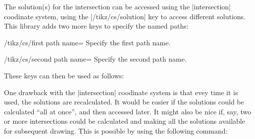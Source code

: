 The solution(s) for the intersection can be accessed using the
  |intersection| coodinate system, using the |/tikz/cs/solution| key
  to access different solutions. This library adds two more keys
  to specify the named paths:

\begin{key}{/tikz/cs/first path name=}
  Specify the first path name.
\end{key}

\begin{key}{/tikz/cs/second path name=}
  Specify the second path name.
\end{key}
  
  These keys can then be used as follows:
  
\begin{codeexample}[]
\end{codeexample}

  One drawback with the |intersection| coodinate system is that
  evey time it is used, the solutions are recalculated. It would be
  easier if the solutions could be calculated ``all at once'', and
  then accessed later. It might also be nice if, say, two or
  more intersections could be calculated and making all the solutions
  available for subsequent drawing.
  This is possible by using the following command:
 
